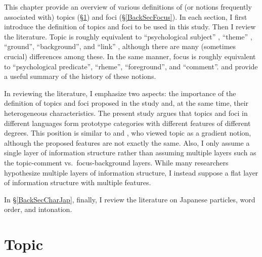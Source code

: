 This chapter provide an overview of various definitions of (or notions frequently associated with) topics (\S \ref{BackSecTopic}) and foci (\S \ref{BackSecFocus}).
In each section,
I first introduce the definition of topics and foci to be used in this study.
Then I review the literature.
Topic is roughly equivalent to ``psychological subject'' \cite{gabelentz69}, ``theme'' \cite[e.g.,][]{danes70,halliday04}, ``ground'', ``background'', and ``link'' \cite{vallduvi94},
although there are many (sometimes crucial) differences among these.
In the same manner,
focus is roughly equivalent to ``psychological predicate'', ``rheme'', ``foreground'', and ``comment''.
 and  provide a useful summary of the history of these notions.

In reviewing the literature,
I emphasize two aspects:
the importance of the definition of topics and foci proposed in the study and, at the same time,
their heterogeneous characteristics.
The present study argues that topics and foci in different languages form prototype categories with different features of different degrees.
This position is similar to  and ,
who viewed topic as a gradient notion,
although the proposed features are not exactly the same.
Also, I only assume a single layer of information structure
rather than assuming multiple layers such as the topic-comment vs.~focus-background layers.
While many researchers hypothesize multiple layers of information structure,
I instead suppose a flat layer of information structure with multiple features.


In \S \ref{BackSecCharJap}, finally,
I review the literature on Japanese particles, word order, and intonation.


\section{Topic}\label{BackSecTopic}

